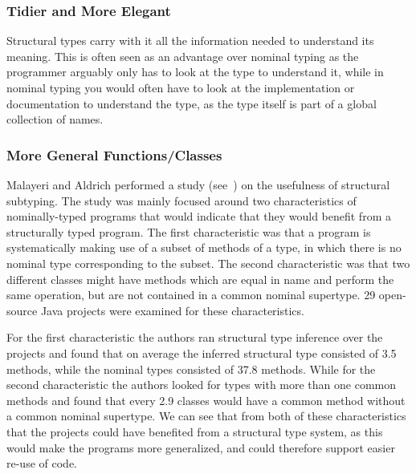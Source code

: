 \subsubsection{Tidier and More Elegant}\label{subsubsec:tidier-and-more-elegant}

Structural types carry with it all the information needed to understand its meaning.
This is often seen as an advantage over nominal typing as the programmer arguably only has to look at the type to understand it, while in nominal typing you would often have to look at the implementation or documentation to understand the type, as the type itself is part of a global collection of names.

%

\subsubsection{More General Functions/Classes}\label{subsubsec:more-general-functions}

Malayeri and Aldrich performed a study (see~\cite{malayeri}) on the usefulness of structural subtyping.
The study was mainly focused around two characteristics of nominally-typed programs that would indicate that they would benefit from a structurally typed program.
The first characteristic was that a program is systematically making use of a subset of methods of a type, in which there is no nominal type corresponding to the subset.
The second characteristic was that two different classes might have methods which are equal in name and perform the same operation, but are not contained in a common nominal supertype.
29 open-source Java projects were examined for these characteristics.

For the first characteristic the authors ran structural type inference over the projects and found that on average the inferred structural type consisted of 3.5 methods, while the nominal types consisted of 37.8 methods.
While for the second characteristic the authors looked for types with more than one common methods and found that every 2.9 classes would have a common method without a common nominal supertype.
We can see that from both of these characteristics that the projects could have benefited from a structural type system, as this would make the programs more generalized, and could therefore support easier re-use of code.

